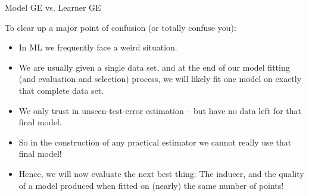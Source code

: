 \documentclass[11pt,compress,t,notes=noshow, xcolor=table]{beamer}
\begin{document}
\begin{vbframe}{Model GE vs. Learner GE}

To clear up a major point of confusion (or totally confuse you):
\medskip

\begin{itemize}
  \item In ML we frequently face a weird situation.
  \item We are usually given a single data set, and at the end of our model fitting (and evaluation and selection) process, we will likely fit one model on exactly that 
  complete data set. 
  \item We only trust in unseen-test-error estimation -- but have no data left for that
      final model. 
  \item So in the construction of any practical estimator we cannot really use that final model!


  \item Hence, we will now evaluate the next best thing: The inducer, 
      and the quality of a model produced when fitted on (nearly) the same number of points!
\end{itemize}

\end{vbframe}






\end{document}
